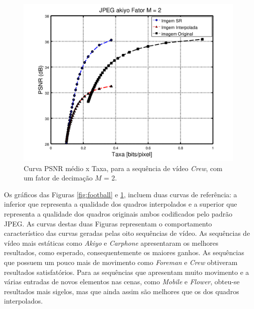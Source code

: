 \begin{figure}[H]
	\centering
	\includegraphics[scale=0.5]{figuras/JPEG_akiyo_Downsampling_factor_2.png}
	\caption{Curva PSNR médio x Taxa, para a sequência de vídeo \textit{Crew}, com um fator de decimação $M$ = 2.}
	\label{fig:akiyo}
\end{figure}

Os gráficos das Figuras \ref{fig:football} e \ref{fig:akiyo}, incluem duas curvas de referência: a inferior que representa a qualidade dos quadros interpolados e a superior que representa a qualidade dos quadros originais ambos codificados pelo padrão JPEG. As curvas destas duas Figuras representam o comportamento característico das curvas geradas pelas oito sequências de vídeo. As sequências de vídeo mais estáticas como \textit{Akiyo} e \textit{Carphone} apresentaram os melhores resultados, como esperado, consequentemente os maiores ganhos. As sequências que possuem um pouco mais de movimento como \textit{Foreman} e \textit{Crew} obtiveram resultados satisfatórios. Para as sequências que apresentam muito movimento e a várias entradas de novos elementos nas cenas, como \textit{Mobile} e \textit{Flower}, obteu-se resultados mais sigelos, mas que ainda assim são melhores que os dos quadros interpolados.

